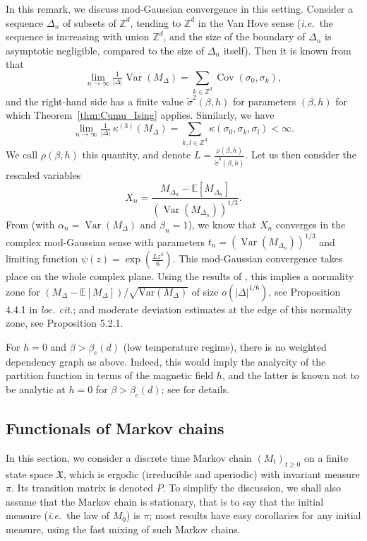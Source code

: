 \documentclass[envcountsame]{svmult}
\newcommand{\Z}{\mathbb{Z}}
\newcommand{\esper}{\mathbb{E}}
\newcommand{\spa}{\mathfrak{X}}
\newcommand{\var}{\mathrm{Var}}
\DeclareMathOperator{\Var}{Var}
\DeclareMathOperator{\Cov}{Cov}
\begin{document}
\begin{remark}
  In this remark, we discuss mod-Gaussian convergence in this setting.
  Consider a sequence $\Delta_n$ of subsets of $\Z^d$,
  tending to $\Z^d$ in the Van Hove sense
  (\emph{i.e.}~the sequence is increasing with union $\Z^d$,
  and the size of the boundary of $\Delta_n$ is asymptotic negligible,
  compared to the size of $\Delta_n$ itself).
Then
it is known from \cite[Lemma 5.7.1]{Ellis} that 
\[\lim_{n \to \infty} \tfrac{1}{|\Delta|} \Var(M_\Delta) = \sum_{k \in \Z^d} \Cov(\sigma_0,\sigma_k),\]
and the right-hand side has a finite value $\widetilde{\sigma}^2(\beta,h)$
for parameters $(\beta,h)$ for which Theorem~\ref{thm:Cumu_Ising} applies.
Similarly, we have
\[\lim_{n \to \infty} \tfrac{1}{|\Delta|} \,\kappa^{(3)}(M_\Delta) = \sum_{k,l \in \Z^d} \kappa(\sigma_0,\sigma_k,\sigma_l) < \infty.\]
We call $\rho(\beta,h)$ this quantity, and denote $L=\tfrac{\rho(\beta,h)}{\widetilde{\sigma}^3(\beta,h)}$. Let us then consider the rescaled variables
$$X_n=\frac{M_{\Delta_n}-\esper[M_{\Delta_n}]}{(\Var(M_{\Delta_n}))^{1/3}}.$$ 
From \cite[Section 5]{FMN16} (with $\alpha_n=\Var(M_\Delta)$ and $\beta_n=1$),
we know that $X_n$ converges in the complex mod-Gaussian sense
with parameters $t_n=(\Var(M_{\Delta_n}))^{1/3}$ and limiting function $\psi(z)=\exp(\frac{L z^3}{6})$.
This mod-Gaussian convergence takes place on the whole complex plane.
Using the results of \cite{FMN16}, this implies a normality zone for $(M_\Delta-\esper[M_\Delta])/\sqrt{\var(M_\Delta)}$ of size $o(|\Delta|^{1/6})$, see Proposition 4.4.1 in \emph{loc. cit.}; and moderate deviation estimates at the edge of this normality zone, see Proposition 5.2.1.
\end{remark}

\begin{remark}
  For $h=0$ and  $\beta>\beta_c(d)$ (low temperature regime),
  there is no weighted dependency graph as above.
  Indeed, this would imply the analycity of the partition function
  in terms of the magnetic field $h$, and the latter
  is known not to be analytic at $h=0$ for $\beta>\beta_c(d)$;
  see \cite[Chapter 6, §5]{MM91} for details.
\end{remark}



\subsection{Functionals of Markov chains}
In this section, we consider a discrete time
Markov chain $(M_t)_{t \ge 0}$ on a finite state space $\spa$, which is ergodic (irreducible and aperiodic) with invariant measure $\pi$. Its transition matrix is denoted $P$. To simplify the discussion, we shall also assume that the Markov chain is stationary, that is to say that the initial measure (\emph{i.e.}~the law of $M_0$) is $\pi$; most results have easy corollaries for any initial measure, using the fast mixing of such Markov chains.
 \medskip
\end{document}
